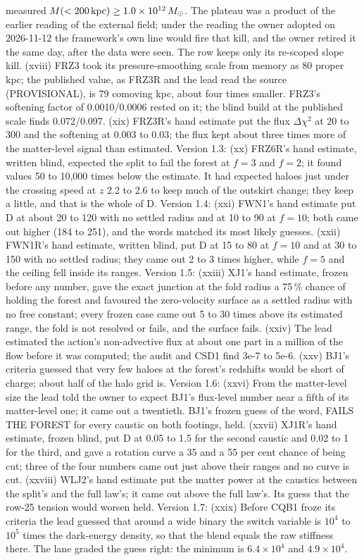 \documentclass[10pt]{article}
\begin{document}
measured $M(<200\,{\rm kpc})\ge1.0\times10^{12}\,M_\odot$. The plateau was a product of the earlier reading of the external field; under the reading the owner adopted on 2026-11-12 the framework's own line would fire that kill, and the owner retired it the same day, after the data were seen. The row keeps only its re-scoped slope kill. (xviii) FRZ3 took its pressure-smoothing scale from memory as 80 proper kpc; the published value, as FRZ3R and the lead read the source (PROVISIONAL), is 79 comoving kpc, about four times smaller. FRZ3's softening factor of 0.0010/0.0006 rested on it; the blind build at the published scale finds 0.072/0.097. (xix) FRZ3R's hand estimate put the flux $\Delta\chi^2$ at 20 to 300 and the softening at 0.003 to 0.03; the flux kept about three times more of the matter-level signal than estimated. Version 1.3: (xx) FRZ6R's hand estimate, written blind, expected the split to fail the forest at $f=3$ and $f=2$; it found values 50 to 10,000 times below the estimate. It had expected haloes just under the crossing speed at $z$ 2.2 to 2.6 to keep much of the outskirt change; they keep a little, and that is the whole of D. Version 1.4: (xxi) FWN1's hand estimate put D at about 20 to 120 with no settled radius and at 10 to 90 at $f=10$; both came out higher (184 to 251), and the words matched its most likely guesses. (xxii) FWN1R's hand estimate, written blind, put D at 15 to 80 at $f=10$ and at 30 to 150 with no settled radius; they came out 2 to 3 times higher, while $f=5$ and the ceiling fell inside its ranges. Version 1.5: (xxiii) XJ1's hand estimate, frozen before any number, gave the exact junction at the fold radius a 75\,\% chance of holding the forest and favoured the zero-velocity surface as a settled radius with no free constant; every frozen case came out 5 to 30 times above its estimated range, the fold is not resolved or fails, and the surface fails. (xxiv) The lead estimated the action's non-advective flux at about one part in a million of the flow before it was computed; the audit and CSD1 find 3e-7 to 5e-6. (xxv) BJ1's criteria guessed that very few haloes at the forest's redshifts would be short of charge; about half of the halo grid is. Version 1.6: (xxvi) From the matter-level size the lead told the owner to expect BJ1's flux-level number near a fifth of its matter-level one; it came out a twentieth. BJ1's frozen guess of the word, FAILS THE FOREST for every caustic on both footings, held. (xxvii) XJ1R's hand estimate, frozen blind, put D at 0.05 to 1.5 for the second caustic and 0.02 to 1 for the third, and gave a rotation curve a 35 and a 55 per cent chance of being cut; three of the four numbers came out just above their ranges and no curve is cut. (xxviii) WLJ2's hand estimate put the matter power at the caustics between the split's and the full law's; it came out above the full law's. Its guess that the row-25 tension would worsen held. Version 1.7: (xxix) Before CQB1 froze its criteria the lead guessed that around a wide binary the switch variable is $10^4$ to $10^5$ times the dark-energy density, so that the blend equals the raw stiffness there. The lane graded the guess right: the minimum is $6.4\times10^4$ and $4.9\times10^4$.
\end{document}
